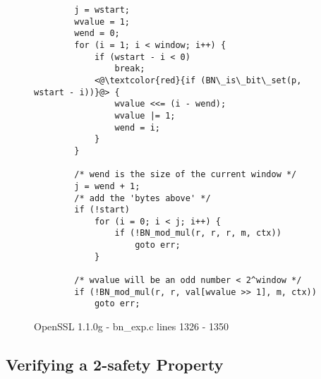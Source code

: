      \begin{figure}[!htpb]
       \begin{lstlisting}
        j = wstart;
        wvalue = 1;
        wend = 0;
        for (i = 1; i < window; i++) {
            if (wstart - i < 0)
                break;
            <@\textcolor{red}{if (BN\_is\_bit\_set(p, wstart - i))}@> {
                wvalue <<= (i - wend);
                wvalue |= 1;
                wend = i;
            }
        }

        /* wend is the size of the current window */
        j = wend + 1;
        /* add the 'bytes above' */
        if (!start)
            for (i = 0; i < j; i++) {
                if (!BN_mod_mul(r, r, r, m, ctx))
                    goto err;
            }

        /* wvalue will be an odd number < 2^window */
        if (!BN_mod_mul(r, r, val[wvalue >> 1], m, ctx))
            goto err;
       \end{lstlisting}
       \caption{OpenSSL 1.1.0g - bn\_exp.c lines 1326 - 1350}
       \label{openssl:simple}
     \end{figure}

\subsection{Verifying a 2-safety Property}

